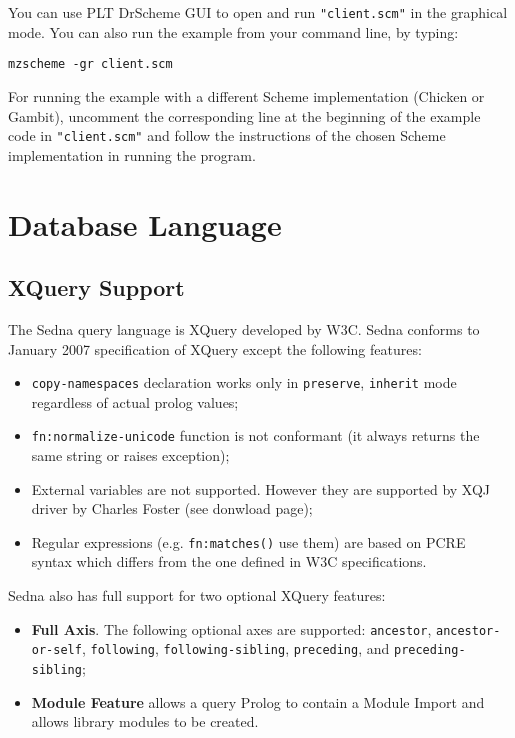 \documentclass[a4paper,12pt]{article}
\begin{document}
You can use PLT DrScheme GUI to open and run \texttt{"client.scm"} in the
graphical mode. You can also run the example from your command line, by typing:

\begin{verbatim}
mzscheme -gr client.scm
\end{verbatim}

For running the example with a different Scheme implementation (Chicken or
Gambit), uncomment the corresponding line at the beginning of the example code
in \texttt{"client.scm"} and follow the instructions of the chosen Scheme
implementation in running the program.


\section{Database Language}
\label{sec:DBLang}

\subsection{XQuery Support}
\label{sec:xquery-support}
The Sedna query language is XQuery \cite{paper:query-language} developed by W3C.
Sedna conforms to January 2007 specification of XQuery except the following
features:

\begin{itemize}
\item \verb!copy-namespaces! declaration works only in \verb!preserve!,
\verb!inherit! mode regardless of actual prolog values;
\item \verb!fn:normalize-unicode! function is not conformant (it always returns
the same string or raises exception);
\item External variables are not supported. However they are supported by XQJ
driver by Charles Foster (see donwload page);
\item Regular expressions (e.g. \verb!fn:matches()! use them) are based on
PCRE~\cite{lib:pcre-lib} syntax which differs from the one defined in W3C
specifications.
\end{itemize}

Sedna also has full support for two optional XQuery features:
\begin{itemize}
\item\textbf{Full Axis}. The following optional axes are supported:
\verb!ancestor!, \verb!ancestor-or-self!, \verb!following!,
\verb!following-sibling!, \verb!preceding!, and \verb!preceding-sibling!;
\item\textbf{Module Feature} allows a query Prolog to contain a Module Import
and allows library modules to be created.
\end{itemize}
\end{document}
